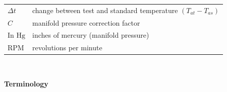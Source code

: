 \documentclass[
]{book}
\begin{document}
\begin{longtable}[]{@{}ll@{}}
\begin{minipage}[t]{0.13\columnwidth}
\(\Delta t\)\strut
\end{minipage} & \begin{minipage}[t]{0.81\columnwidth}\raggedright
change between test and standard temperature \(\left( T_{at} - T_{as} \right)\)\strut
\end{minipage}\tabularnewline
\begin{minipage}[t]{0.13\columnwidth}\raggedright
\(C\)\strut
\end{minipage} & \begin{minipage}[t]{0.81\columnwidth}\raggedright
manifold pressure correction factor\strut
\end{minipage}\tabularnewline
\begin{minipage}[t]{0.13\columnwidth}\raggedright
\(\text{In Hg}\)\strut
\end{minipage} & \begin{minipage}[t]{0.81\columnwidth}\raggedright
inches of mercury (manifold pressure)\strut
\end{minipage}\tabularnewline
\begin{minipage}[t]{0.13\columnwidth}\raggedright
\(\mathrm{RPM}\)\strut
\end{minipage} & \begin{minipage}[t]{0.81\columnwidth}\raggedright
revolutions per minute\strut
\end{minipage}\tabularnewline
\bottomrule
\end{longtable}

~

\textbf{Terminology}
\end{document}
